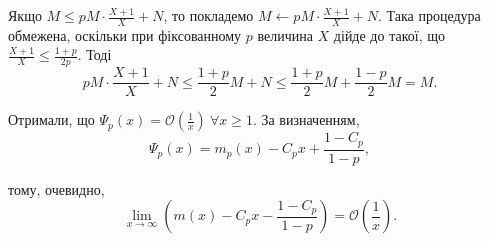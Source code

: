 Якщо $M \leq p M \cdot \frac{X+1}{X} + N$, то покладемо $M \leftarrow p M \cdot \frac{X+1}{X} + N$. Така процедура обмежена, оскільки при фіксованному $p$ величина $X$ дійде до такої, що $\frac{X+1}{X} \leq \frac{1+p}{2p}$. Тоді
\begin{equation*}
p M \cdot \frac{X+1}{X} + N \leq \frac{1+p}{2} M + N \leq \frac{1+p}{2} M + \frac{1-p}{2} M = M.
\end{equation*}

Отримали, що $\Psi_{p}(x) = \mathcal{O}\left(\frac{1}{x}\right) ~ \forall x \geq 1$. За визначенням, 
\begin{equation*}
\Psi_{p}(x) = m_{p}(x) - C_{p} x + \frac{1 - C_p}{1-p},
\end{equation*}

тому, очевидно, 
\begin{equation}
\label{eq:uniform_right_as_enhanced}
\lim\limits_{x \rightarrow \infty} \left( m(x) - C_{p} x - \frac{1 - C_{p}}{1 - p} \right) = \mathcal{O}\left(\frac{1}{x}\right).
\end{equation}

